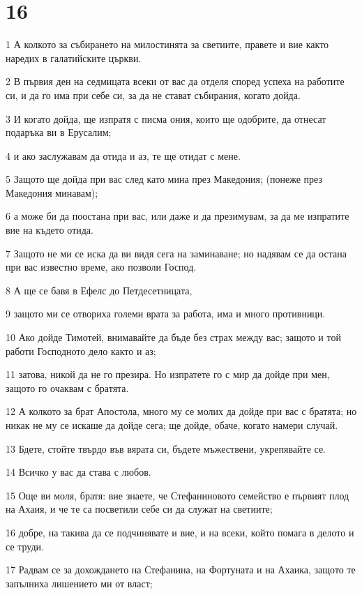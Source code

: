 \chapter{16}

\par 1 А колкото за събирането на милостинята за светиите, правете и вие както наредих в галатийските църкви.
\par 2 В първия ден на седмицата всеки от вас да отделя според успеха на работите си, и да го има при себе си, за да не стават събирания, когато дойда.
\par 3 И когато дойда, ще изпратя с писма ония, които ще одобрите, да отнесат подаръка ви в Ерусалим;
\par 4 и ако заслужавам да отида и аз, те ще отидат с мене.
\par 5 Защото ще дойда при вас след като мина през Македония; (понеже през Македония минавам);
\par 6 а може би да поостана при вас, или даже и да презимувам, за да ме изпратите вие на където отида.
\par 7 Защото не ми се иска да ви видя сега на заминаване; но надявам се да остана при вас известно време, ако позволи Господ.
\par 8 А ще се бавя в Ефелс до Петдесетницата,
\par 9 защото ми се отвориха големи врата за работа, има и много противници.
\par 10 Ако дойде Тимотей, внимавайте да бъде без страх между вас; защото и той работи Господното дело както и аз;
\par 11 затова, никой да не го презира. Но изпратете го с мир да дойде при мен, защото го очаквам с братята.
\par 12 А колкото за брат Апостола, много му се молих да дойде при вас с братята; но никак не му се искаше да дойде сега; ще дойде, обаче, когато намери случай.
\par 13 Бдете, стойте твърдо във вярата си, бъдете мъжествени, укрепявайте се.
\par 14 Всичко у вас да става с любов.
\par 15 Още ви моля, братя: вие знаете, че Стефаниновото семейство е първият плод на Ахаия, и че те са посветили себе си да служат на светиите;
\par 16 добре, на такива да се подчинявате и вие, и на всеки, който помага в делото и се труди.
\par 17 Радвам се за дохождането на Стефанина, на Фортуната и на Ахаика, защото те запълниха лишението ми от власт;
